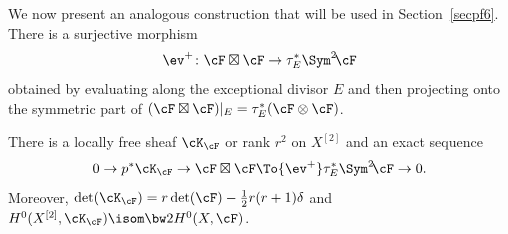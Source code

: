 We now present an analogous construction that will be used in Section~\ref{secpf6}. There is a surjective morphism
\[\label{eqmorph}
\ev^+\colon \cF \boxtimes\cF\to \tau_E^*\Sym^2\!\cF
\]
obtained by evaluating along the exceptional divisor $E$ and then projecting onto the symmetric part of
$(\cF \boxtimes\cF)\vert_{ E}=\tau_E^*( \cF\otimes\cF)$.

\begin{lemm}\label{ledescend}
There is a locally free sheaf $\cK_\cF$ or rank $r^2$ on $X^{[2]}$ and an exact sequence
\begin{equation}\label{eqcK}
0\to p^*\cK_\cF \to \cF\boxtimes\cF \To{\ev^+} \tau_E^*\Sym^2\!\cF\to 0.
\end{equation}
Moreover, $\det(\cK_\cF)=r\det(\cF)- \frac12 r(r+1)\delta $ and $H^0(X^{[2]},\cK_\cF)\isom \bw2H^0(X,\cF)$.
\end{lemm}

